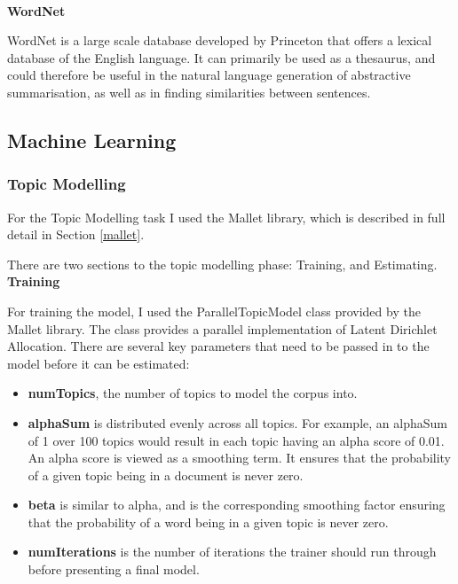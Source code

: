 \documentclass[12pt]{article}
\begin{document}
\textbf{\\ WordNet}

\label{WordNet}

WordNet \cite{wordnet} is a large scale database developed by Princeton \cite{princeton} that offers a lexical database of the English language. It can primarily be used as a thesaurus, and could therefore be useful in the natural language generation of abstractive summarisation, as well as in finding similarities between sentences.

\subsection{Machine Learning}

\label{machinelearning}

\subsubsection{Topic Modelling}

\label{tm}

For the Topic Modelling task I used the Mallet \cite{mallet} library, which is described in full detail in Section \ref{mallet}.

There are two sections to the topic modelling phase: Training, and Estimating. \\

\textbf{Training}

For training the model, I used the ParallelTopicModel class provided by the Mallet library. The class provides a parallel implementation of Latent Dirichlet Allocation. There are several key parameters that need to be passed in to the model before it can be estimated:

\begin{itemize}
	\item \textbf{numTopics}, the number of topics to model the corpus into.
	\item \textbf{alphaSum} is distributed evenly across all topics. For example, an alphaSum of 1 over 100 topics would result in each topic having an alpha score of 0.01. An alpha score is viewed as a smoothing term. It ensures that the probability of a given topic being in a document is never zero.
	\item \textbf{beta} is similar to alpha, and is the corresponding smoothing factor ensuring that the probability of a word being in a given topic is never zero.
	\item \textbf{numIterations} is the number of iterations the trainer should run through before presenting a final model.
\end{itemize}
\end{document}
